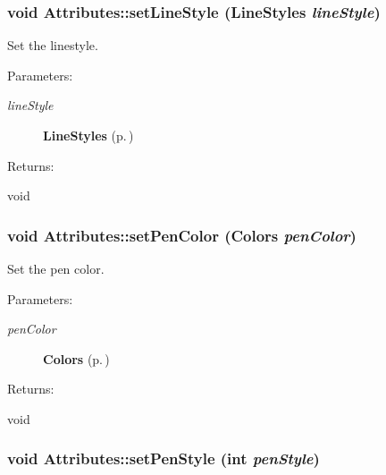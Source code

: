 \subsubsection{\setlength{\rightskip}{0pt plus 5cm}void Attributes::set\-Line\-Style ({\bf Line\-Styles} {\em line\-Style})\hspace{0.3cm}{\tt  [inline]}}\label{classAttributes_a2}


Set the linestyle. \begin{Desc}
\item[Parameters: ]\par
\begin{description}
\item[{\em 
line\-Style}]{\bf Line\-Styles} {\rm (p.\,\pageref{classAttributes_s74})} \end{description}
\end{Desc}
\begin{Desc}
\item[Returns: ]\par
void \end{Desc}
\subsubsection{\setlength{\rightskip}{0pt plus 5cm}void Attributes::set\-Pen\-Color ({\bf Colors} {\em pen\-Color})\hspace{0.3cm}{\tt  [inline]}}\label{classAttributes_a4}


Set the pen color. \begin{Desc}
\item[Parameters: ]\par
\begin{description}
\item[{\em 
pen\-Color}]{\bf Colors} {\rm (p.\,\pageref{classAttributes_s75})} \end{description}
\end{Desc}
\begin{Desc}
\item[Returns: ]\par
void \end{Desc}
\subsubsection{\setlength{\rightskip}{0pt plus 5cm}void Attributes::set\-Pen\-Style (int {\em pen\-Style})\hspace{0.3cm}{\tt  [inline]}}\label{classAttributes_a7}


